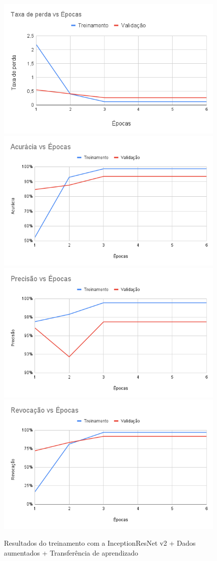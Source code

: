 \documentclass[
	12pt,				%
	oneside,			%
	a4paper,			%
	english,			%
	brazil				%
	]{abntex2ppgsi}
\begin{document}
\begin{figure}[H]
    \centering
    \caption{Resultados do treinamento com a InceptionResNet v2 + Dados aumentados + Transferência de aprendizado}
    \includegraphics[width=.50\textwidth]{imagens/resultados_discussao/architecture/inception_resnet_v2/transfer_learning/augmented/perda.png}\hfill
    \includegraphics[width=.50\textwidth]{imagens/resultados_discussao/architecture/inception_resnet_v2/transfer_learning/augmented/acuracia.png}\bigbreak    \includegraphics[width=.50\textwidth]{imagens/resultados_discussao/architecture/inception_resnet_v2/transfer_learning/augmented/precisao.png}\hfill
    \includegraphics[width=.50\textwidth]{imagens/resultados_discussao/architecture/inception_resnet_v2/transfer_learning/augmented/revocacao.png}
    \label{fig:inception_resnet_v2_augmented_transfer_learning}
\end{figure}
\end{document}
